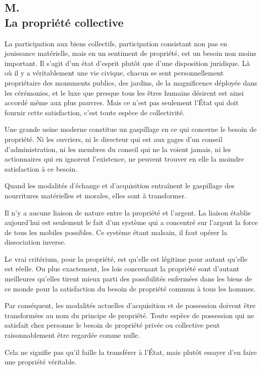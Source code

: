 \documentclass[french,twoside]{book} %
\begin{document}
\subsection[M. La propriété collective]{M. \\
La propriété collective}
\noindent \par
La participation aux biens collectifs, participation consistant non pas en jouissance matérielle, mais en un sentiment de propriété, est un besoin non moins important. Il s'agit d'un état d'esprit plutôt que d'une disposition juridique. Là où il y a véritablement une vie civique, chacun se sent personnellement propriétaire des monuments publics, des jardins, de la magnificence déployée dans les cérémonies, et le luxe que presque tous les êtres humains désirent est ainsi accordé même aux plus pauvres. Mais ce n'est pas seulement l'État qui doit fournir cette satisfaction, c'est toute espèce de collectivité.\par
Une grande usine moderne constitue un gaspillage en ce qui concerne le besoin de propriété. Ni les ouvriers, ni le directeur qui est aux gages d'un conseil d'administration, ni les membres du conseil qui ne la voient jamais, ni les actionnaires qui en ignorent l'existence, ne peuvent trouver en elle la moindre satisfaction à ce besoin.\par
Quand les modalités d'échange et d'acquisition entraînent le gaspillage des nourritures matérielles et morales, elles sont à transformer.\par
Il n'y a aucune liaison de nature entre la propriété et l'argent. La liaison établie aujourd'hui est seulement le fait d'un système qui a concentré sur l'argent la force de tous les mobiles possibles. Ce système étant malsain, il faut opérer la dissociation inverse.\par
Le vrai critérium, pour la propriété, est qu'elle est légitime pour autant qu'elle est réelle. Ou plus exactement, les lois concernant la propriété sont d'autant meilleures qu'elles tirent mieux parti des possibilités enfermées dans les biens de ce monde pour la satisfaction du besoin de propriété commun à tous les hommes.\par
Par conséquent, les modalités actuelles d'acquisition et de possession doivent être transformées au nom du principe de propriété. Toute espèce de possession qui ne satisfait chez personne le besoin de propriété privée ou collective peut raisonnablement être regardée comme nulle.\par
Cela ne signifie pas qu'il faille la transférer à l'État, mais plutôt essayer d'en faire une propriété véritable.
\end{document}
